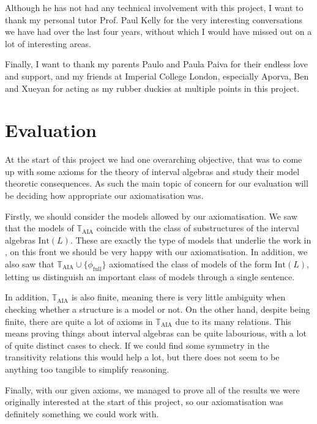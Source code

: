 \documentclass[11pt %
              ]{article}
\newcommand{\theory}{\mathbb{T}}
\newcommand{\taia}{\theory_\text{AIA}}
\newcommand{\inter}[1][-]{\text{Int}\left(#1\right)}
\newcommand{\defformula}[1]{\phi_{#1}}
\newcommand{\allints}{\defformula{\text{full}}}
\theoremstyle{plain}
\theoremstyle{definition}
\theoremstyle{remark}
\begin{document}
Although he has not had any technical involvement with this project, I want to thank my personal
tutor Prof. Paul Kelly for the very interesting conversations we have had over the last four years,
without which I would have missed out on a lot of interesting areas.

Finally, I want to thank my parents Paulo and Paula Paiva for their endless love and support, and
my friends at Imperial College London, especially Aporva, Ben and Xueyan for acting as my
rubber duckies at multiple points in this project.

\vfill
\hspace{0pt}

\newpage
\tableofcontents

\newpage
\pagestyle{fancy}
\fancyhf{}
\lhead{\nouppercase{\leftmark}}
\fancyfoot[C]{\thepage}
\setlength{\headheight}{13.59999pt}
\addtolength{\topmargin}{-1.59999pt}




\newpage


\newpage


\newpage
\section{Evaluation}

At the start of this project we had one overarching objective, that was to come up with some axioms
for the theory of interval algebras and study their model theoretic consequences.
As such the main topic of concern for our evaluation will be deciding how appropriate our
axiomatisation was.

Firstly, we should consider the models allowed by our axiomatisation. We saw that the models of
$\taia$ coincide with the class of substructures of the interval algebras $\inter[L]$.
These are exactly the type of models that underlie the work in \cite{allen83}, on this front
we should be very happy with our axiomatisation. In addition, we also saw that
$\taia \cup \{\allints\}$ axiomatised the class of models of the form $\inter[L]$, letting us
distinguish an important class of models through a single sentence.

In addition, $\taia$ is also finite, meaning there is very little ambiguity when checking
whether a structure is a model or not. On the other hand, despite being finite, there are quite
a lot of axioms in $\taia$ due to its many relations. This means proving things about
interval algebras can be quite labourious, with a lot of quite distinct cases to check. If we could
find some symmetry in the transitivity relations this would help a lot, but there does not seem
to be anything too tangible to simplify reasoning.

Finally, with our given axioms, we managed to prove all of the results we were originally
interested at the start of this project, so our axiomatisation was definitely something we could
work with.

\newpage


\newpage


\end{document}
